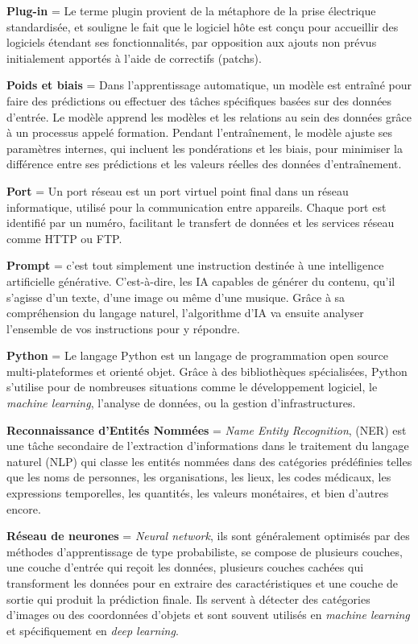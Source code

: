 \textbf{Plug-in} = Le terme plugin provient de la métaphore de la prise électrique standardisée, et souligne le fait que le logiciel hôte est conçu pour accueillir des logiciels étendant ses fonctionnalités, par opposition aux ajouts non prévus initialement apportés à l'aide de correctifs (patchs).

\textbf{Poids et biais} = Dans l'apprentissage automatique, un modèle est entraîné pour faire des prédictions ou effectuer des tâches spécifiques basées sur des données d'entrée. Le modèle apprend les modèles et les relations au sein des données grâce à un processus appelé formation. Pendant l'entraînement, le modèle ajuste ses paramètres internes, qui incluent les pondérations et les biais, pour minimiser la différence entre ses prédictions et les valeurs réelles des données d'entraînement.

\textbf{Port} = Un port réseau est un port virtuel point final dans un réseau informatique, utilisé pour la communication entre appareils. Chaque port est identifié par un numéro, facilitant le transfert de données et les services réseau comme HTTP ou FTP.

\textbf{Prompt} = c’est tout simplement une instruction destinée à une intelligence artificielle générative. C’est-à-dire, les IA capables de générer du contenu, qu’il s’agisse d’un texte, d’une image ou même d’une musique. Grâce à sa compréhension du langage naturel, l’algorithme d’IA va ensuite analyser l’ensemble de vos instructions pour y répondre.

\textbf{Python} = Le langage Python est un langage de programmation open source multi-plateformes et orienté objet. Grâce à des bibliothèques spécialisées, Python s'utilise pour de nombreuses situations comme le développement logiciel, le \textit{machine learning}, l'analyse de données, ou la gestion d'infrastructures. 

\textbf{Reconnaissance d'Entités Nommées} = \textit{Name Entity Recognition}, (NER) est une tâche secondaire de l'extraction d'informations dans le traitement du langage naturel (NLP) qui classe les entités nommées dans des catégories prédéfinies telles que les noms de personnes, les organisations, les lieux, les codes médicaux, les expressions temporelles, les quantités, les valeurs monétaires, et bien d'autres encore.

\textbf{Réseau de neurones} = \textit{Neural network}, ils sont généralement optimisés par des méthodes d'apprentissage de type probabiliste, se compose de plusieurs couches, une couche d'entrée qui reçoit les données, plusieurs couches cachées qui transforment les données pour en extraire des caractéristiques et une couche de sortie qui produit la prédiction finale. Ils servent à détecter des catégories d'images ou des coordonnées d'objets et sont souvent utilisés en \textit{machine learning} et spécifiquement en \textit{deep learning}.


